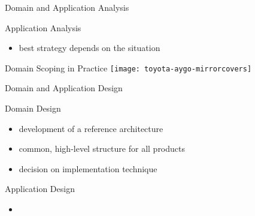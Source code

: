 \begin{frame}{Domain and Application Analysis}
\begin{mycolumns}[T,columns=3,widths={10}]
\begin{definition}{Application Analysis}
\begin{itemize}
\begin{enumerate}
						\item document for custom development (i.e., development in application engineering)
						\item integrate into domain analysis (i.e., development in domain engineering)
					\end{enumerate}
				\item best strategy depends on the situation
			\end{itemize}
		\end{definition}
	\end{mycolumns}
\end{frame}

\begin{frame}{Domain Scoping in Practice}
	\centering\texttt{[image: toyota-aygo-mirrorcovers]}
\end{frame}

\begin{frame}{Domain and Application Design}
	\begin{mycolumns}[T,columns=3,widths={10}]
		\renewcommand{\projectcartoonwidth}{1}
	\mynextcolumn
		\begin{definition}{Domain Design} %
			\begin{itemize}
				\item development of a reference architecture
				\item common, high-level structure for all products
				\item decision on implementation technique
			\end{itemize}
		\end{definition}
	\mynextcolumn
		\begin{definition}{Application Design}
			\begin{itemize}
				\item 
			\end{itemize}
		\end{definition}
	\end{mycolumns}
\end{frame}

